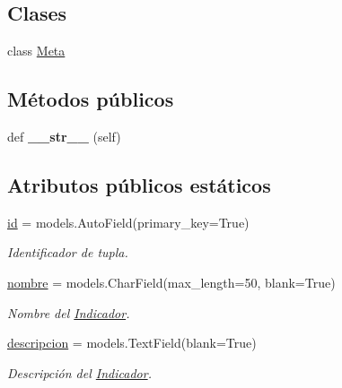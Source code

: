\subsection*{Clases}
\begin{DoxyCompactItemize}
\item 
class \hyperlink{classappEmotionIOT_1_1models_1_1Indicador_1_1Meta}{Meta}
\end{DoxyCompactItemize}
\subsection*{Métodos públicos}
\begin{DoxyCompactItemize}
\item 
def {\bfseries \+\_\+\+\_\+str\+\_\+\+\_\+} (self)\hypertarget{classappEmotionIOT_1_1models_1_1Indicador_aec6bf69eaf5e15325cf4ce860d811dd6}{}\label{classappEmotionIOT_1_1models_1_1Indicador_aec6bf69eaf5e15325cf4ce860d811dd6}

\end{DoxyCompactItemize}
\subsection*{Atributos públicos estáticos}
\begin{DoxyCompactItemize}
\item 
\hyperlink{classappEmotionIOT_1_1models_1_1Indicador_a1fa03b728a43d816fd34ff5b34420e07}{id} = models.\+Auto\+Field(primary\+\_\+key=True)\hypertarget{classappEmotionIOT_1_1models_1_1Indicador_a1fa03b728a43d816fd34ff5b34420e07}{}\label{classappEmotionIOT_1_1models_1_1Indicador_a1fa03b728a43d816fd34ff5b34420e07}

\begin{DoxyCompactList}\small\item\em Identificador de tupla. \end{DoxyCompactList}\item 
\hyperlink{classappEmotionIOT_1_1models_1_1Indicador_a2e2ca32c26ba1728565831cfab065d05}{nombre} = models.\+Char\+Field(max\+\_\+length=50, blank=True)\hypertarget{classappEmotionIOT_1_1models_1_1Indicador_a2e2ca32c26ba1728565831cfab065d05}{}\label{classappEmotionIOT_1_1models_1_1Indicador_a2e2ca32c26ba1728565831cfab065d05}

\begin{DoxyCompactList}\small\item\em Nombre del \hyperlink{classappEmotionIOT_1_1models_1_1Indicador}{Indicador}. \end{DoxyCompactList}\item 
\hyperlink{classappEmotionIOT_1_1models_1_1Indicador_a8de860cfe63111fc879f82ef19773709}{descripcion} = models.\+Text\+Field(blank=True)\hypertarget{classappEmotionIOT_1_1models_1_1Indicador_a8de860cfe63111fc879f82ef19773709}{}\label{classappEmotionIOT_1_1models_1_1Indicador_a8de860cfe63111fc879f82ef19773709}

\begin{DoxyCompactList}\small\item\em Descripción del \hyperlink{classappEmotionIOT_1_1models_1_1Indicador}{Indicador}. \end{DoxyCompactList}\end{DoxyCompactItemize}


